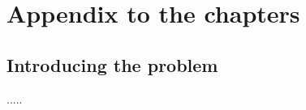 \documentclass[open=any, 11pt,paper=A4]{scrreprt}
\begin{document}
\chapter{Appendix to the chapters} \label{ch:appendix}
\section{Introducing the problem}\label{sec: appendix to chap 1}

.....

\fi 

\medskip
\printbibliography[heading=bibintoc,title={References}] %
\end{document}
